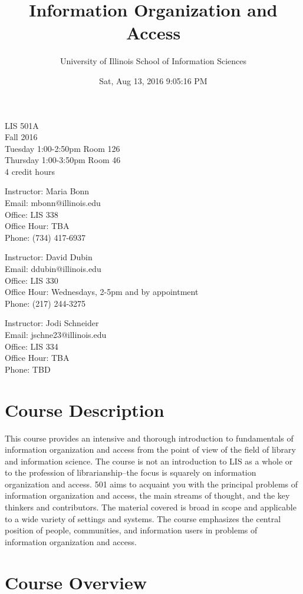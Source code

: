 \documentclass[]{article}
\title{Information Organization and Access}
\author{University of Illinois School of Information Sciences}
\date{Sat, Aug 13, 2016 9:05:16 PM}
\begin{document}
\maketitle

LIS 501A\\
Fall 2016\\
Tuesday 1:00-2:50pm Room 126\\
Thursday 1:00-3:50pm Room 46\\
4 credit hours

Instructor: Maria Bonn\\
Email: mbonn@illinois.edu\\
Office: LIS 338\\
Office Hour: TBA\\
Phone: (734) 417-6937

Instructor: David Dubin\\
Email: ddubin@illinois.edu\\
Office: LIS 330\\
Office Hour: Wednesdays, 2-5pm and by appointment\\
Phone: (217) 244-3275

Instructor: Jodi Schneider\\
Email: jschne23@illinois.edu\\
Office: LIS 334\\
Office Hour: TBA\\
Phone: TBD

\section{Course Description}\label{course-description}

This course provides an intensive and thorough introduction to
fundamentals of information organization and access from the point of
view of the field of library and information science. The course is not
an introduction to LIS as a whole or to the profession of
librarianship--the focus is squarely on information organization and
access. 501 aims to acquaint you with the principal problems of
information organization and access, the main streams of thought, and
the key thinkers and contributors. The material covered is broad in
scope and applicable to a wide variety of settings and systems. The
course emphasizes the central position of people, communities, and
information users in problems of information organization and access.

\section{Course Overview}\label{course-overview}
\end{document}

